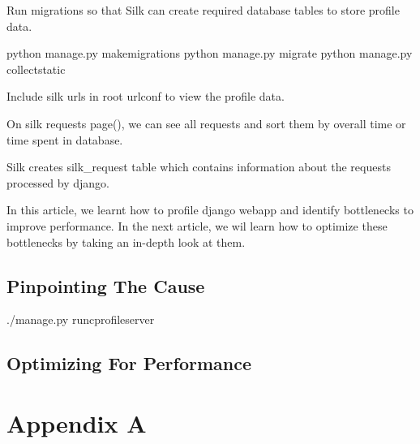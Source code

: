 \documentclass[letterpaper,11pt,english]{sphinxmanual}
\begin{document}
Run migrations so that Silk can create required database tables to store profile data.

\begin{sphinxVerbatim}[commandchars=\\\{\}]
\PYGZdl{} python manage.py makemigrations
\PYGZdl{} python manage.py migrate
\PYGZdl{} python manage.py collectstatic
\end{sphinxVerbatim}

Include silk urls in root urlconf to view the profile data.

\begin{sphinxVerbatim}[commandchars=\\\{\}]
  \PYG{p}{[}  \PYG{p}{]}
\end{sphinxVerbatim}

On silk requests page(), we can see all requests and sort them by overall time or time spent in database.

Silk creates silk\_request table which contains information about the requests processed by django.

In this article, we learnt how to profile django webapp and identify bottlenecks to improve performance. In the next article, we wil learn how to optimize these bottlenecks by taking an in-depth look at them.


\section{Pinpointing The Cause}
\label{\detokenize{misc_profiling:pinpointing-the-cause}}
./manage.py runcprofileserver


\section{Optimizing For Performance}
\label{\detokenize{misc_profiling:optimizing-for-performance}}

\chapter{Appendix A}
\label{\detokenize{appendix:appendix-a}}\label{\detokenize{appendix::doc}}
\end{document}

